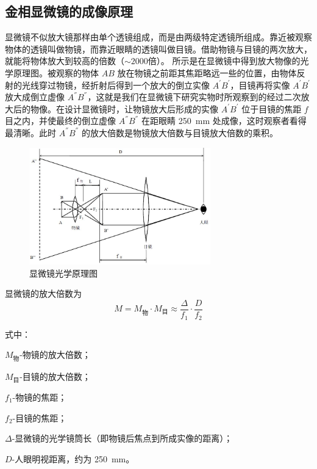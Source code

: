     \subsection{金相显微镜的成像原理}
        显微镜不似放大镜那样由单个透镜组成，而是由两级特定透镜所组成。靠近被观察物体的透镜叫做物镜，而靠近眼睛的透镜叫做目镜。借助物镜与目镜的两次放大，就能将物体放大到较高的倍数（$\sim 2000$倍）。 所示是在显微镜中得到放大物像的光学原理图。被观察的物体 $AB$ 放在物镜之前距其焦距略远一些的位置，由物体反射的光线穿过物镜，经折射后得到一个放大的倒立实像 $A^{'}B^{'}$，目镜再将实像 $A^{'}B^{'}$ 放大成倒立虚像 $A^{''}B^{''}$，这就是我们在显微镜下研究实物时所观察到的经过二次放大后的物像。在设计显微镜时，让物镜放大后形成的实像 $A^{'}B^{'}$ 位于目镜的焦距 $f$ 目之内，并使最终的倒立虚像 $A^{''}B^{''}$ 在距眼睛 \SI{250}{\mm} 处成像，这时观察者看得最清晰。此时 $A^{''}B^{''}$ 的放大倍数是物镜放大倍数与目镜放大倍数的乘积。
        \begin{figure}[!ht]
            \caption{显微镜光学原理图\label{fig:microscope}}
            \includegraphics[width=0.7\textwidth]{img/A1/microscope.jpg}
        \end{figure}\par
        显微镜的放大倍数为
        \begin{equation}
            M=M_\text{物}\cdot M_\text{目}\approx\frac{\Delta}{f_1}\cdot\frac D{f_2}
            \label{equ:A1.1}
        \end{equation}\par
        式中：
        \begin{minipage}[t]{100mm}
            $M_\text{物}$-物镜的放大倍数；\par
            $M_\text{目}$-目镜的放大倍数；\par
            $f_1$-物镜的焦距；\par
            $f_2$-目镜的焦距；\par
            $\Delta$-显微镜的光学镜筒长（即物镜后焦点到所成实像的距离）；\par
            $D$-人眼明视距离，约为 \SI{250}{\mm}。\par
        \end{minipage}
